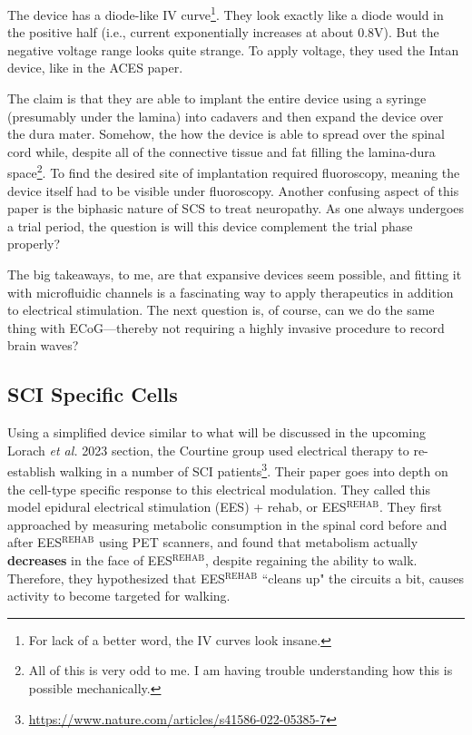 \documentclass[12pt]{report}
\begin{document}
The device has a diode-like IV curve\footnote{For lack of a better word, the IV curves look insane.}. They look exactly like a diode would in the positive half (i.e., current exponentially increases at about 0.8V). But the negative voltage range looks quite strange. To apply voltage, they used the Intan device, like in the ACES paper.\newline

The claim is that they are able to implant the entire device using a syringe (presumably under the lamina) into cadavers and then expand the device over the dura mater. Somehow, the how the device is able to spread over the spinal cord while, despite all of the connective tissue and fat filling the lamina-dura space\footnote{All of this is very odd to me. I am having trouble understanding how this is possible mechanically.}. To find the desired site of implantation required fluoroscopy, meaning the device itself had to be visible under fluoroscopy. Another confusing aspect of this paper is the biphasic nature of SCS to treat neuropathy. As one always undergoes a trial period, the question is will this device complement the trial phase properly?\newline

The big takeaways, to me, are that expansive devices seem possible, and fitting it with microfluidic channels is a fascinating way to apply therapeutics in addition to electrical stimulation. The next question is, of course, can we do the same thing with ECoG---thereby not requiring a highly invasive procedure to record brain waves? 

\subsection{SCI Specific Cells}

Using a simplified device similar to what will be discussed in the upcoming Lorach \textit{et al.} 2023 section, the Courtine group used electrical therapy to re-establish walking in a number of SCI patients\footnote{\url{https://www.nature.com/articles/s41586-022-05385-7}}. Their paper goes into depth on the cell-type specific response to this electrical modulation. They called this model epidural electrical stimulation (EES) + rehab, or EES$^{\mathrm{REHAB}}$. They first approached by measuring metabolic consumption in the spinal cord before and after EES$^{\mathrm{REHAB}}$ using PET scanners, and found that metabolism actually \textbf{decreases} in the face of EES$^{\mathrm{REHAB}}$, despite regaining the ability to walk. Therefore, they hypothesized that EES$^{\mathrm{REHAB}}$ ``cleans up" the circuits a bit, causes activity to become targeted for walking.\newline
\end{document}

